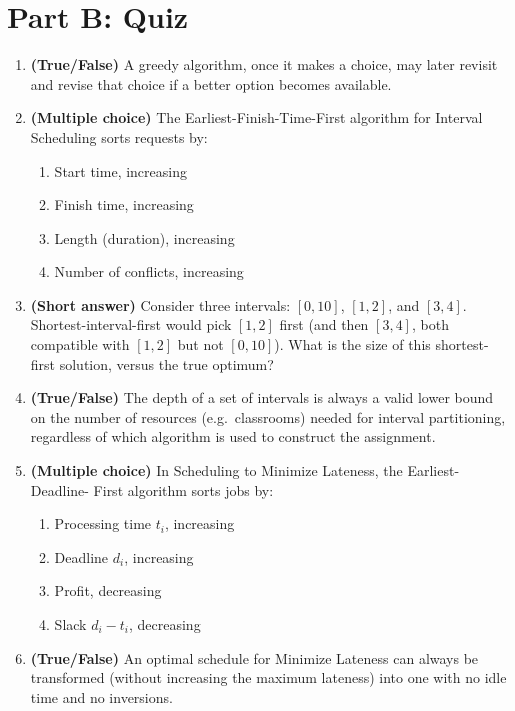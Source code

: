\documentclass[11pt]{article}
\begin{document}
\newpage
\section*{Part B: Quiz}

\begin{enumerate}[label=\textbf{B\arabic*.}, leftmargin=2.2em]

\item \textbf{(True/False)} A greedy algorithm, once it makes a choice, may later revisit
and revise that choice if a better option becomes available.

\item \textbf{(Multiple choice)} The Earliest-Finish-Time-First algorithm for Interval
Scheduling sorts requests by:
\begin{enumerate}[label=(\alph*)]
    \item Start time, increasing
    \item Finish time, increasing
    \item Length (duration), increasing
    \item Number of conflicts, increasing
\end{enumerate}

\item \textbf{(Short answer)} Consider three intervals: $[0,10]$, $[1,2]$, and $[3,4]$.
Shortest-interval-first would pick $[1,2]$ first (and then $[3,4]$, both compatible with
$[1,2]$ but not $[0,10]$). What is the size of this shortest-first solution, versus the
true optimum?

\item \textbf{(True/False)} The depth of a set of intervals is always a valid lower bound
on the number of resources (e.g.\ classrooms) needed for interval partitioning, regardless
of which algorithm is used to construct the assignment.

\item \textbf{(Multiple choice)} In Scheduling to Minimize Lateness, the Earliest-Deadline-
First algorithm sorts jobs by:
\begin{enumerate}[label=(\alph*)]
    \item Processing time $t_i$, increasing
    \item Deadline $d_i$, increasing
    \item Profit, decreasing
    \item Slack $d_i - t_i$, decreasing
\end{enumerate}

\item \textbf{(True/False)} An optimal schedule for Minimize Lateness can always be
transformed (without increasing the maximum lateness) into one with no idle time and no
inversions.


\end{enumerate}
\end{document}
